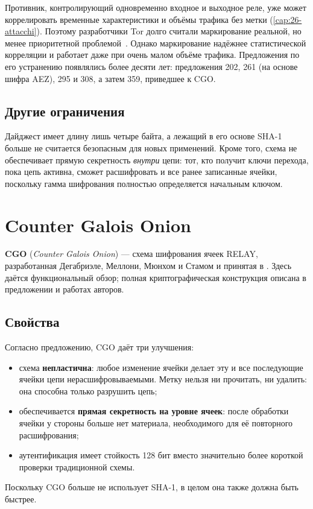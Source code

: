 \begin{approfondimento}
Противник, контролирующий одновременно входное и выходное реле, уже может коррелировать временные характеристики и объёмы трафика без метки (\cref{cap:26-attacchi}). Поэтому разработчики Tor долго считали маркирование реальной, но менее приоритетной проблемой~\cite{dingledine2004tor}. Однако маркирование надёжнее статистической корреляции и работает даже при очень малом объёме трафика. Предложения по его устранению появлялись более десяти лет: предложения 202, 261 (на основе шифра AEZ), 295 и 308, а затем 359, приведшее к CGO.
\end{approfondimento}

\subsection{Другие ограничения}

Дайджест имеет длину лишь четыре байта, а лежащий в его основе SHA-1 больше не считается безопасным для новых применений. Кроме того, схема не обеспечивает прямую секретность \emph{внутри} цепи: тот, кто получит ключи перехода, пока цепь активна, сможет расшифровать и все ранее записанные ячейки, поскольку гамма шифрования полностью определяется начальным ключом.

\section{Counter Galois Onion}\label{sec:cgo}

\textbf{CGO} (\emph{Counter Galois Onion}) --- схема шифрования ячеек RELAY, разработанная Дегабриэле, Меллони, Мюнхом и Стамом и принятая в . Здесь даётся функциональный обзор; полная криптографическая конструкция описана в предложении и работах авторов.

\subsection{Свойства}

Согласно предложению, CGO даёт три улучшения:
\begin{itemize}
  \item схема \textbf{непластична}: любое изменение ячейки делает эту и все последующие ячейки цепи нерасшифровываемыми. Метку нельзя ни прочитать, ни удалить: она способна только разрушить цепь;
  \item обеспечивается \textbf{прямая секретность на уровне ячеек}: после обработки ячейки у стороны больше нет материала, необходимого для её повторного расшифрования;
  \item аутентификация имеет стойкость 128 бит вместо значительно более короткой проверки традиционной схемы.
\end{itemize}
Поскольку CGO больше не использует SHA-1, в целом она также должна быть быстрее.

